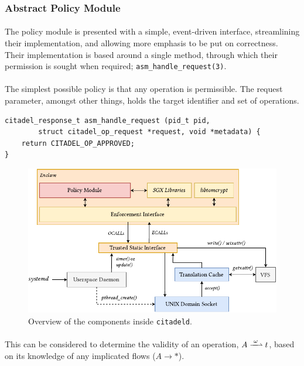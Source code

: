 \subsubsection{Abstract Policy Module}
\paragraph{} The policy module is presented with a simple, event-driven interface, streamlining their implementation, and allowing more emphasis to be put on correctness. Their implementation is based around a single method, through which their permission is sought when required; \texttt{asm\_handle\_request(3)}.


\paragraph{} The simplest possible policy is that any operation is permissible. The request parameter, amongst other things, holds the target identifier and set of operations. 

\vspace{3mm}
\begin{verbatim}
citadel_response_t asm_handle_request (pid_t pid, 
        struct citadel_op_request *request, void *metadata) {
    return CITADEL_OP_APPROVED;
}
\end{verbatim}

\begin{figure}[]
    \centering
    \includegraphics[width=0.9\linewidth]{figures/EnclaveLayout.pdf}
    \caption{Overview of the components inside \texttt{citadeld}.}
    \label{fig:policy-enclave}
\end{figure}

\paragraph{} This can be considered to determine the validity of an operation, $A \xrightharpoonup{\;\omega\;} t$, based on its knowledge of any implicated flows ($A \rightarrow *$).

